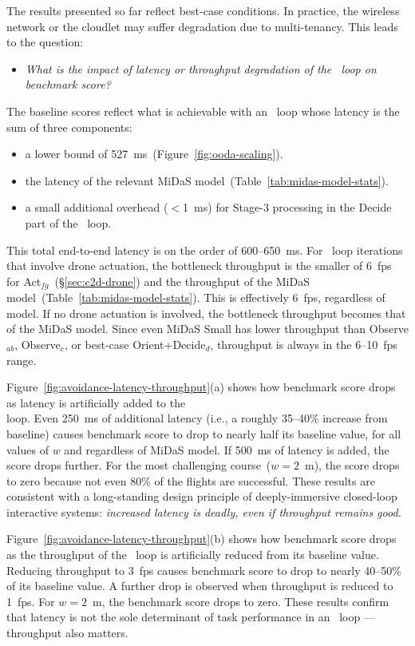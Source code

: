 The results presented so far reflect best-case conditions.  In
practice, the wireless network or the cloudlet may suffer degradation
due to multi-tenancy.  This leads to the question:
\begin{itemize}
\item{\em What is the impact of latency or throughput degradation of
    the \ooda~loop on benchmark score?}
\end{itemize}
The baseline scores reflect what is
achievable with an \ooda~loop whose latency is the sum of three
components:
\begin{itemize}
\item{a lower bound of 527~ms~(Figure~\ref{fig:ooda-scaling}).}

\item{the latency of the relevant MiDaS model~(Table~\ref{tab:midas-model-stats}).}

\item{a small additional overhead ($<$1~ms) for Stage-3 processing
    in the Decide part of the \ooda~loop.}
\end{itemize}

This total end-to-end latency is on the order of 600--650~ms.  For
\ooda~loop iterations that involve drone actuation, the bottleneck
throughput is the smaller of 6~fps for
Act$_{fg}$~(\S\ref{sec:c2d-drone}) and the throughput of the MiDaS
model~(Table~\ref{tab:midas-model-stats}).  This is effectively
6~fps, regardless of model.  If no drone actuation is involved, the
bottleneck throughput becomes that of the MiDaS model.  Since even
MiDaS Small has lower throughput than Observe$_{ab}$, Observe$_{c}$,
or best-case Orient+Decide$_d$, throughput is always in the 6--10~fps
range.

Figure~\ref{fig:avoidance-latency-throughput}(a) shows how benchmark
score drops as latency is artificially added to the \ooda \\ loop.  Even
250~ms of additional latency (i.e., a roughly 35--40\% increase from
baseline) causes benchmark score to drop to nearly half its baseline
value, for all values of $w$ and regardless of MiDaS model.  If 500~ms
of latency is added, the score drops further.  For the most
challenging course~($w = 2$~m), the score drops to zero because not
even 80\% of the flights are successful.  These results are consistent
with a long-standing design principle of deeply-immersive closed-loop
interactive systems: {\em increased latency is deadly, even if
  throughput remains good.}

Figure~\ref{fig:avoidance-latency-throughput}(b) shows how benchmark
score drops as the throughput of the \ooda~loop is artificially
reduced from its baseline value.  Reducing throughput to 3~fps causes
benchmark score to drop to nearly 40--50\% of its baseline value.  A
further drop is observed when throughput is reduced to 1~fps.  For $w
= 2$~m, the benchmark score drops to zero.  These results confirm that
latency is not the sole determinant of task performance in an
\ooda~loop --- throughput also matters.

